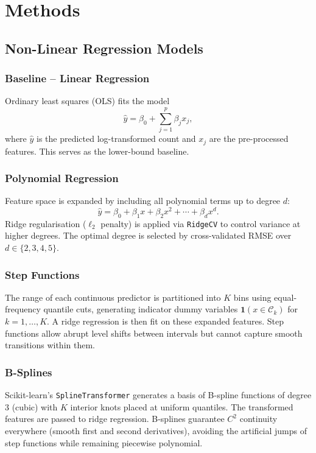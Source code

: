 \documentclass[conference]{IEEEtran}
\begin{document}
\section{Methods}\label{sec:methods}

\subsection{Non-Linear Regression Models}

\subsubsection{Baseline -- Linear Regression}
Ordinary least squares (OLS) fits the model
\begin{equation}
  \hat{y} = \beta_0 + \sum_{j=1}^{p} \beta_j x_j,
  \label{eq:ols}
\end{equation}
where $\hat{y}$ is the predicted log-transformed count and $x_j$ are
the pre-processed features. This serves as the lower-bound baseline.

\subsubsection{Polynomial Regression}
Feature space is expanded by including all polynomial terms up to degree $d$:
\begin{equation}
  \hat{y} = \beta_0 + \beta_1 x + \beta_2 x^2 + \cdots + \beta_d x^d.
  \label{eq:poly}
\end{equation}
Ridge regularisation ($\ell_2$ penalty) is applied via \texttt{RidgeCV} to
control variance at higher degrees. The optimal degree is selected by
cross-validated RMSE over $d \in \{2, 3, 4, 5\}$.

\subsubsection{Step Functions}
The range of each continuous predictor is partitioned into $K$ bins using
equal-frequency quantile cuts, generating indicator dummy variables
$\mathbf{1}(x \in \mathcal{C}_k)$ for $k = 1, \ldots, K$. A ridge regression
is then fit on these expanded features. Step functions allow abrupt level
shifts between intervals but cannot capture smooth transitions within them.

\subsubsection{B-Splines}
Scikit-learn's \texttt{SplineTransformer} generates a basis of B-spline
functions of degree 3 (cubic) with $K$ interior knots placed at uniform
quantiles. The transformed features are passed to ridge regression. B-splines
guarantee $C^2$ continuity everywhere (smooth first and second derivatives),
avoiding the artificial jumps of step functions while remaining piecewise
polynomial.
\end{document}
